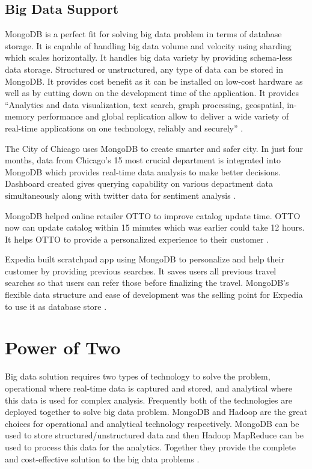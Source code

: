 \documentclass[sigconf]{acmart}
\begin{document}
\subsection{Big Data Support}
MongoDB is a perfect fit for solving big data problem in terms of database storage. It is capable of handling big data volume and velocity using sharding which scales horizontally. It handles big data variety by providing schema-less data storage. Structured or unstructured, any type of data can be stored in MongoDB. It provides cost benefit as it can be installed on low-cost hardware as well as by cutting down on the development time of the application. It provides ``Analytics and data visualization, text search, graph processing, geospatial, in-memory performance and global replication allow to deliver a wide variety of real-time applications on one technology, reliably and securely'' \cite{www-mongo-arch}.

The City of Chicago uses MongoDB to create smarter and safer city. In just four months, data from Chicago's 15 most crucial department is integrated into MongoDB which provides real-time data analysis to make better decisions. Dashboard created gives querying capability on various department data simultaneously along with twitter data for sentiment analysis \cite{www-mongo-chicago}. 

MongoDB helped online retailer OTTO to improve catalog update time. OTTO now can update catalog within 15 minutes which was earlier could take 12 hours. It helps OTTO to provide a personalized experience to their customer \cite{www-mongo-otto}.

Expedia built scratchpad app using MongoDB to personalize and help their customer by providing previous searches. It saves users all previous travel searches so that users can refer those before finalizing the travel. MongoDB's flexible data structure and ease of development was the selling point for Expedia to use it as database store \cite{www-mongo-expedia}.

\section{Power of Two}
Big data solution requires two types of technology to solve the problem, operational where real-time data is captured and stored, and analytical where this data is used for complex analysis. Frequently both of the technologies are deployed together to solve big data problem. MongoDB and Hadoop are the great choices for operational and analytical technology respectively. MongoDB can be used to store structured/unstructured data and then Hadoop MapReduce can be used to process this data for the analytics. Together they provide the complete and cost-effective solution to the big data problems \cite{www-mongo-bigdata}.
\end{document}
